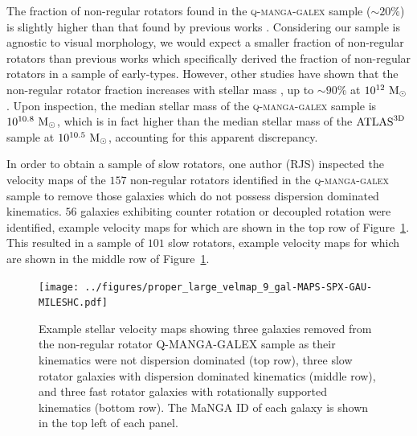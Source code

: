 \documentclass[useAMS,usenatbib]{mn2e}
\begin{document}
The fraction of non-regular rotators found in the \textsc{q-manga-galex} sample ($\sim20\%$) is slightly higher than that found by previous works \citep[$14-17\%$ of early-types in the $\rm{ATLAS}^{\rm{3D}}$ sample; ][]{emsellem11, stott16}. Considering our sample is agnostic to visual morphology, we would expect a smaller fraction of non-regular rotators than previous works which specifically derived the fraction of non-regular rotators in a sample of early-types. However, other studies have shown that the non-regular rotator fraction increases with stellar mass \citep{cappellari13}, up to $\sim90\%$ at $10^{12}~\rm{M}_{\odot}$ \citep{veale17}. Upon inspection, the median stellar mass of the \textsc{q-manga-galex} sample is $10^{10.8}~\rm{M}_{\odot}$, which is in fact higher than the median stellar mass of the $\rm{ATLAS}^{\rm{3D}}$ sample at $10^{10.5}~\rm{M}_{\odot}$, accounting for this apparent discrepancy.

In order to obtain a sample of slow rotators, one author (RJS) inspected the velocity maps of the $157$ non-regular rotators identified in the \textsc{q-manga-galex} sample to remove those galaxies which do not possess dispersion dominated kinematics. $56$ galaxies exhibiting  counter rotation or decoupled rotation were identified, example velocity maps for which are shown in the top row of Figure~\ref{fig:exvelmaps}. This resulted in a sample of $101$ slow rotators, example velocity maps for which are shown in the middle row of Figure~\ref{fig:exvelmaps}.  


\begin{figure}
\centering
\texttt{[image: ../figures/proper\_large\_velmap\_9\_gal-MAPS-SPX-GAU-MILESHC.pdf]}
\caption{Example stellar velocity maps showing three galaxies removed from the non-regular rotator \textsc{Q-MANGA-GALEX} sample as their kinematics were not dispersion dominated (top row), three slow rotator galaxies with dispersion dominated kinematics (middle row), and three fast rotator galaxies with rotationally supported kinematics (bottom row). The MaNGA ID of each galaxy is shown in the top left of each panel.}
\label{fig:exvelmaps}
\end{figure}  
\end{document}

